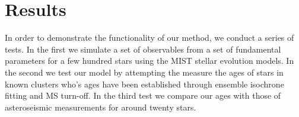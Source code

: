 \section{Results}
\label{section:results}





In order to demonstrate the functionality of our method, we conduct a series
of tests.
In the first we simulate a set of observables from a set of fundamental
parameters for a few hundred stars using the MIST \citep{choi} stellar
evolution models.
In the second we test our model by attempting the measure the ages of stars in
known clusters who's ages have been established through ensemble isochrone
fitting and MS turn-off.
In the third test we compare our ages with those of asteroseismic measurements
for around twenty stars.

